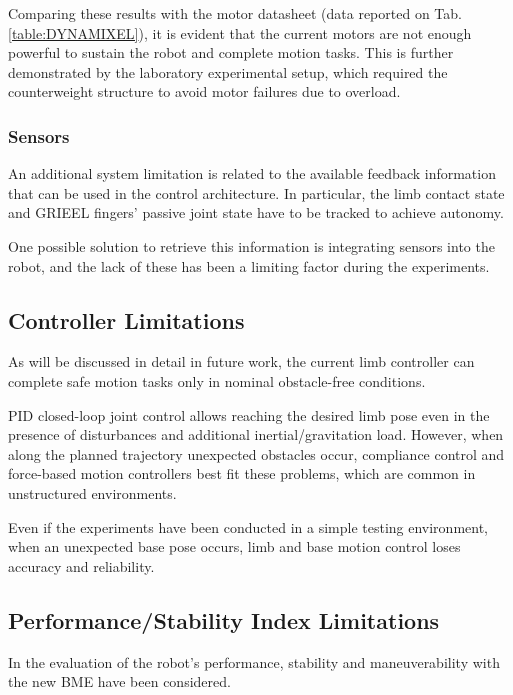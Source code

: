 Comparing these results with the motor datasheet (data reported on Tab.\ref{table:DYNAMIXEL}), it is evident that the current motors are not enough powerful to sustain the robot and complete motion tasks. This is further demonstrated by the laboratory experimental setup, which required the counterweight structure to avoid motor failures due to overload. 

\subsubsection{Sensors}

An additional system limitation is related to the available feedback information that can be used in the control architecture. 
In particular, the limb contact state and GRIEEL fingers' passive joint state have to be tracked to achieve autonomy.

One possible solution to retrieve this information is integrating sensors into the robot, and the lack of these has been a limiting factor during the experiments. 

\subsection{Controller Limitations}
\label{sec:control_limitations}

As will be discussed in detail in future work, the current limb controller can complete safe motion tasks only in nominal obstacle-free conditions. 

PID closed-loop joint control allows reaching the desired limb pose even in the presence of disturbances and additional inertial/gravitation load. However, when along the planned trajectory unexpected obstacles occur, compliance control and force-based motion controllers best fit these problems, which are common in unstructured environments.   

Even if the experiments have been conducted in a simple testing environment, when an unexpected base pose occurs, limb and base motion control loses accuracy and reliability. 

\subsection{Performance/Stability Index Limitations}
\label{sec:control_limitations}

In the evaluation of the robot's performance, stability and maneuverability with the new BME have been considered. 

